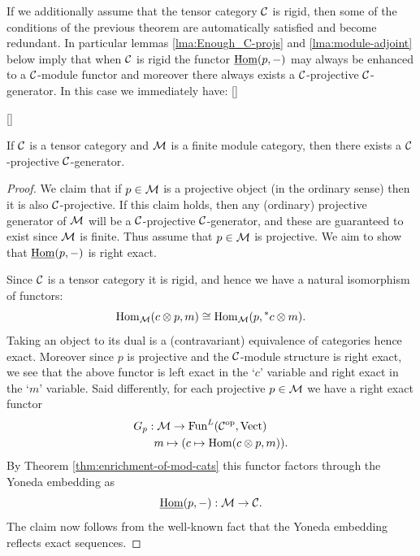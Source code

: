 \documentclass{amsart}
\begin{document}
If we additionally assume that the tensor category $\mathcal C$ is rigid, then some of the conditions of the previous theorem are automatically satisfied and become redundant. In particular lemmas \ref{lma:Enough_C-projs} and \ref{lma:module-adjoint} below imply that when $\mathcal C$ is rigid the functor $\operatorname{\underline{Hom}}(p,-)$ may always be enhanced to a $\mathcal C$-module functor and moreover there always exists a $\mathcal C$-projective $\mathcal C$-generator. In this case we immediately have: []

[]

\begin{lemma} \label{lma:Enough_C-projs}
	If $\mathcal C$ is a tensor category and $\mathcal M$ is a finite module category, then there exists a $\mathcal C$-projective $\mathcal C$-generator. 
\end{lemma} 

\begin{proof}
	We claim that if $p \in \mathcal M$ is a projective object (in the ordinary sense) then it is also $\mathcal C$-projective. If this claim holds, then any (ordinary) projective generator of $\mathcal M$ will be a $\mathcal C$-projective $\mathcal C$-generator, and these are guaranteed to exist since $\mathcal M$ is finite. Thus assume that $p \in \mathcal M$ is projective.  We aim to show that $\operatorname{\underline{Hom}}(p, -)$ is right exact. 
	
	Since $\mathcal C$ is a tensor category it is rigid, and hence we have a natural isomorphism of functors:
\begin{equation*}
	\operatorname{Hom}_{\mathcal M}(c \otimes p, m) \cong \operatorname{Hom}_{\mathcal M}(p, {}^*c \otimes m).
\end{equation*}
Taking an object to its dual is a (contravariant) equivalence of categories hence exact. Moreover since $p$ is projective and the $\mathcal C$-module structure is right exact, we see that the above functor is left exact in the `$c$' variable and right exact in the `$m$' variable. Said differently, for each projective $p \in \mathcal M$ we have a right exact functor
\begin{align*}
	G_p: & \; \mathcal M \to \operatorname{Fun}^L(\mathcal C^{\mathrm{op}}, \mathrm{Vect}) \\
	& m \mapsto (c \mapsto \operatorname{Hom}(c \otimes p, m)).
\end{align*}
By Theorem \ref{thm:enrichment-of-mod-cats} this functor factors through the Yoneda embedding as
\begin{equation*}
	\operatorname{\underline{Hom}}(p, -): \mathcal M \to \mathcal C.
\end{equation*}
The claim now follows from the well-known fact that the Yoneda embedding reflects exact sequences. 
\end{proof}
\end{document}
